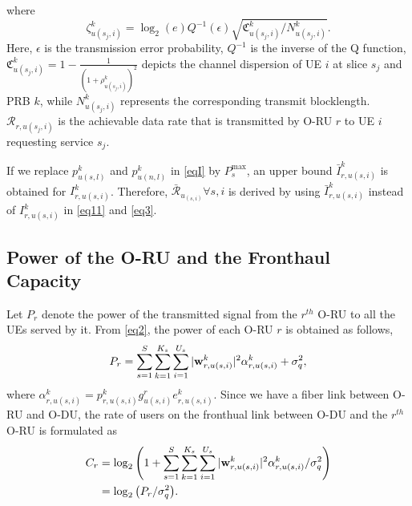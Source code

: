 \documentclass[lettersize,journal]{IEEEtran}
\begin{document}
where %
\begin{equation}\label{shortPacket}
 \zeta_{u(s_j,i)}^{k} = \log_2({e})Q^{-1}(\epsilon) \sqrt{\mathfrak{C}_{u(s_j,i)}^{k}/N_{u(s_j,i)}^{k}}.
\end{equation}
Here, $\epsilon$ is the transmission error probability, $Q^{-1}$ is the inverse of the Q function,
$\mathfrak{C}_{u(s_j,i)}^{k} = 1 - \frac{1}{(1+\rho_{u(s_j,i)}^{k})^2}$ depicts the channel dispersion of UE  $i$ at slice $s_j$ and PRB $k$, while
$N_{u(s_j,i)}^{k}$ represents the corresponding transmit blocklength.
$\mathcal{R}_{r,u(s_j,i)}$ is the achievable data rate that is transmitted by O-RU $r$ to UE $i$ requesting service $s_j$.

If we replace $p_{u(s,l)}^{k}$ and $p_{u(n,l)}^{k}$ in \eqref{eqI} by $P_{s}^{\text{max}}$, an upper bound $\bar{I}_{r,u(s,i)}^{k}$ is obtained for $I_{r,u(s,i)}^{k}$. Therefore, $\bar{\mathcal{R}}_{u_{(s,i)}} \forall s , i$ is derived by using $\bar{I}_{r,u(s,i)}^{k}$ instead of $I_{r,u(s,i)}^{k}$ in  \eqref{eq11} and \eqref{eq3}.
\subsection{Power of the O-RU and the Fronthaul Capacity}
Let $P_r$ denote the power of the transmitted signal from the $r^{th}$ O-RU to all the UEs served by it. From \eqref{eq2}, the power of each O-RU $r$ is obtained as follows,
\begin{equation}\label{pr}
P_r = \sum_{s=1}^{S}\sum_{k=1}^{K_s}\sum_{i=1}^{U_s}|\bold{w}_{r,u(s,i)}^{k}|^2\alpha^k_{r,u(s,i)} + \sigma_{q}^2,
\end{equation}
where $\alpha^k_{r,u(s,i)}= p_{r,u(s,i)}^{k} g_{u(s,i)}^r e^k_{r,u(s,i)}$.
Since we have a fiber link between O-RU and O-DU, the rate of users on the fronthual link between O-DU and the $r^{th}$ O-RU  is formulated as
\begin{align}\label{cr}
C_{r} &= \log_2{\left(1+ \sum_{s=1}^{S}\sum_{k=1}^{K_s}\sum_{i=1}^{U_s}|\bold{w}_{r,u(s,i)}^{k}|^2 \mathcal{\alpha}^k_{r,u(s,i)} / \sigma_{q}^2\right)}\nonumber\\
&= \log_2{\left(P_r/\sigma_{q}^2\right)}.
\end{align}
\vspace{-4mm}
\end{document}
